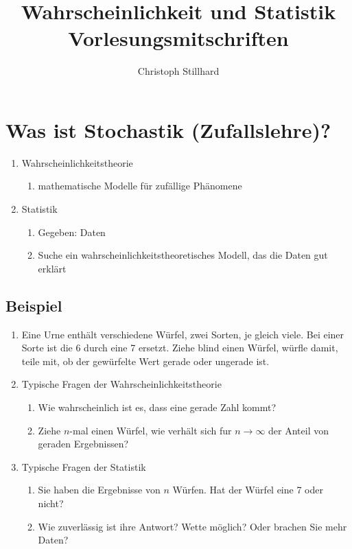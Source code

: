 \documentclass[10pt]{article}
\title{\textbf{Wahrscheinlichkeit und Statistik Vorlesungsmitschriften}}
\author{Christoph Stillhard}
\date{}
\newcommand{\enumstart}{\begin{enumerate}}
\newcommand{\enumend}{\end{enumerate}}
\begin{document}
\maketitle
{}
\thispagestyle{empty}

\let\stdsection\section
\renewcommand\section{\newpage\stdsection}

\newpage
{}
\setcounter{page}{1}
\tableofcontents

\newpage
{}
\setcounter{page}{1}

\section{Was ist Stochastik (Zufallslehre)?}
\enumstart
	\item Wahrscheinlichkeitstheorie
	\enumstart
		\item mathematische Modelle für zufällige Phänomene
	\enumend
	\item Statistik
	\enumstart
		\item Gegeben: Daten
		\item Suche ein wahrscheinlichkeitstheoretisches Modell, das die Daten gut erklärt
	\enumend
\enumend

\subsection{Beispiel}
\enumstart
	\item Eine Urne enthält verschiedene Würfel, zwei Sorten, je gleich viele. Bei einer Sorte ist die 6 durch eine 7 ersetzt. Ziehe blind einen Würfel, würfle damit, teile mit, ob der gewürfelte Wert gerade oder ungerade ist.
	\item Typische Fragen der Wahrscheinlichkeitstheorie
	\enumstart
		\item Wie wahrscheinlich ist es, dass eine gerade Zahl kommt?
		\item Ziehe $n$-mal einen Würfel, wie verhält sich fur $n \rightarrow \infty$ der Anteil von geraden Ergebnissen?
	\enumend
	\item Typische Fragen der Statistik
	\enumstart
		\item Sie haben die Ergebnisse von $n$ Würfen. Hat der Würfel eine 7 oder nicht?
		\item Wie zuverlässig ist ihre Antwort? Wette möglich? Oder brachen Sie mehr Daten?
	\enumend
\enumend
\end{document}
